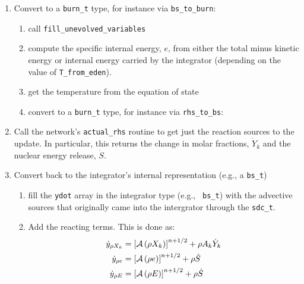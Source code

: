 \begin{enumerate}

\item Convert to a {\tt burn\_t} type, for instance via {\tt bs\_to\_burn}:

  \begin{enumerate}

  \item call {\tt fill\_unevolved\_variables}

  \item compute the specific internal energy, $e$, from either the
    total minus kinetic energy or internal energy carried by the
    integrator (depending on the value of {\tt T\_from\_eden}).

  \item get the temperature from the equation of state

  \item convert to a {\tt burn\_t} type, for instance via {\tt rhs\_to\_bs}:

  \end{enumerate}

\item Call the network's {\tt actual\_rhs} routine to get just the 
 reaction sources to the update.  In particular, this returns
 the change in molar fractions, $\dot{Y}_k$ and the nuclear energy
 release, $\dot{S}$.

\item Convert back to the integrator's internal representation (e.g.,
  a {\tt bs\_t})

  \begin{enumerate}
  \item fill the {\tt ydot} array in the integrator type (e.g., {\tt
    bs\_t}) with the advective sources that originally came into the
    intergrator through the {\tt sdc\_t}.

  \item Add the reacting terms.  This is done as:
    \begin{align}
      \dot{y}_{\rho X_k} &= {\left [\mathcal{A} \left(\rho X_k\right)\right]}^{n+1/2} + \rho A_k \dot{Y}_k \\
      \dot{y}_{\rho e} &= {\left [\mathcal{A} \left(\rho e\right)\right]}^{n+1/2} +\rho \dot{S} \\
      \dot{y}_{\rho E} &= {\left [\mathcal{A} \left(\rho E\right)\right]}^{n+1/2} + \rho \dot{S}
    \end{align}
      
  \end{enumerate}

\end{enumerate}

